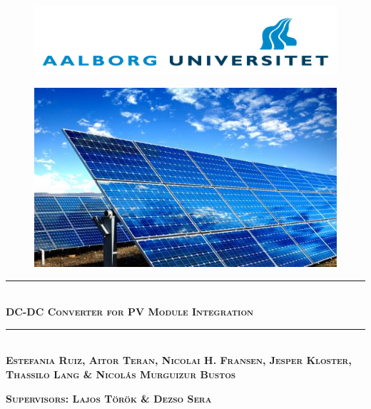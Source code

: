 
\usepackage[export]{adjustbox}

\newcommand\tab[1][1cm]{\hspace*{#1}}


	
\begin{titlingpage}

	
\newcommand{\HRule}{\rule{\linewidth}{0.1mm}} %

\vspace*{-2cm}
\begin{figure}[htbp]
	\begin{center}
		\includegraphics[width=\textwidth]{../Pictures/AAU_logo}
		\label{aau_logo}
	\end{center}	
\end{figure}

\vspace*{2cm}
\begin{figure}[htbp]
	\begin{center}
		\includegraphics[width=\textwidth]{../Pictures/frontpage_pvpanel.png}
		\cite{frontpage_pic}
		\label{frontpage}
	\end{center}	
\end{figure}

\begin{center}
\vspace*{0.5cm}
\HRule \\[0.8cm]
{\huge \bfseries \textsc{DC-DC Converter for PV Module Integration}}\\[0.2cm]
\HRule \\[1.5cm]

\textsc{\textbf{Estefania Ruiz, Aitor Teran, Nicolai H. Fransen, Jesper Kloster, Thassilo Lang \& Nicolás Murguizur Bustos}}


\vspace*{1cm}
\textsc{\textbf{Supervisors: Lajos Török \& Dezso Sera}}
\end{center}
\end{titlingpage}

